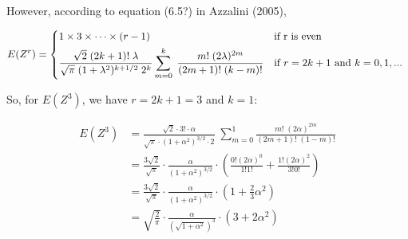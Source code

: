 \documentclass{article}
\begin{document}
However, according to equation (6.5?) in Azzalini (2005),

\[
E(Z^r) =
 \begin{dcases*}
   1 \times 3 \times \cdots \times (r -1) & if r is even \\
   \frac{\sqrt{2}\;(2k + 1)!\;\lambda}{\sqrt{\pi}\;(1 + \lambda^2)^{k + 1/2}\;2^k}
   \sum_{m=0}^k\;\frac{m!\;(2\lambda)^{2m}}{(2m+1)!\;(k-m)!} & if $r = 2k+1$ and $k = 0, 1, ...$
\end{dcases*}
\]

So, for $E(Z^3)$, we have $r = 2k + 1 = 3$ and $k = 1$:

\begin{align}
  E(Z^3) &= \frac{\sqrt{2} \cdot 3! \cdot \alpha}{\sqrt{\pi} \cdot (1 + \alpha^2)^{3/2} \cdot 2} \;
  \sum_{m=0}^1 \frac{m!\;(2\alpha)^{2m}}{(2m + 1)!\;(1 - m)!} \nonumber \\
  &= \frac{3\sqrt{2}}{\sqrt{\pi}} \cdot \frac{\alpha}{(1 + \alpha^2)^{3/2}} \cdot \left( \frac{0!
      (2\alpha)^0}{1!1!} + \frac{1! (2\alpha)^2}{3!0!} \right) \nonumber \\
  &= \frac{3\sqrt{2}}{\sqrt{\pi}} \cdot \frac{\alpha}{(1 + \alpha^2)^{3/2}} \cdot \left( 1 +
    \frac{2}{3}\alpha^2 \right) \nonumber \\
  &= \sqrt{\frac{2}{\pi}} \cdot \frac{\alpha}{(\sqrt{1 + \alpha^2})^3} \cdot (3 + 2 \alpha^2)
\end{align}
\end{document}
